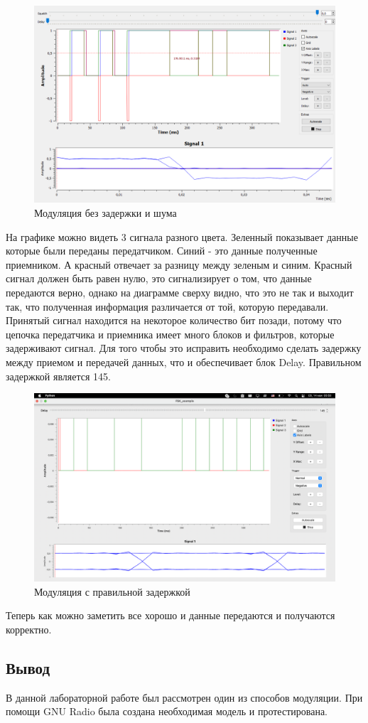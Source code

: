     \begin{figure}[H]
	\begin{center}
		\includegraphics[scale=0.4]{fig/lab12/lab12_2.png}
		\caption{Модуляция без задержки и шума}
		\label{pic:e1} %
	\end{center}
\end{figure}

На графике можно видеть 3 сигнала разного цвета. Зеленный показывает данные которые были переданы передатчиком. Синий - это данные полученные приемником. А красный отвечает за разницу между зеленым и синим. Красный сигнал должен быть равен нулю, это сигнализирует о том, что данные передаются верно, однако на диаграмме сверху видно, что это не так и выходит так, что полученная информация различается от той, которую передавали. Принятый сигнал находится на некоторое количество бит позади, потому что цепочка передатчика и приемника имеет много блоков и фильтров, которые задерживают сигнал. Для того чтобы это исправить необходимо сделать задержку между приемом и передачей данных, что и обеспечивает блок Delay. Правильном задержкой является 145. 

    \begin{figure}[H]
	\begin{center}
		\includegraphics[scale=0.3]{fig/lab12/lab12_3.png}
		\caption{Модуляция с правильной задержкой}
		\label{pic:e2} %
	\end{center}
\end{figure}

Теперь как можно заметить все хорошо и данные передаются и получаются корректно. 

\subsection{Вывод}
В данной лабораторной работе был рассмотрен один из способов модуляции. При помощи GNU Radio была создана необходимая модель и протестирована. 
